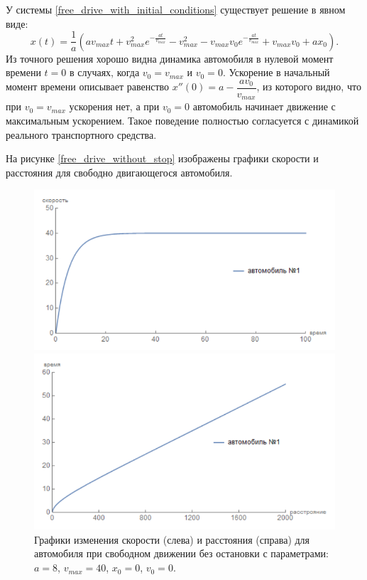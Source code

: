 \documentclass[12pt, a4paper]{extarticle}
\numberwithin{equation}{section}
\begin{document}
У системы \eqref{free_drive_with_initial_conditions} существует решение в явном виде:
\begin{equation*}
x(t) = \dfrac{1}{a}\left(av_{max}t+v_{max}^2e^{-\frac{at}{v_{max}}}-v_{max}^2-v_{max}v_0e^{-\frac{at}{v_{max}}}+v_{max}v_0+ax_0\right). 
\end{equation*}
Из точного решения хорошо видна динамика автомобиля в нулевой момент времени $t=0$ в случаях, когда $v_0=v_{max}$ и $v_0=0$. Ускорение в начальный момент времени описывает равенство $x''(0)=a-\dfrac{av_0}{v_{max}}$, из которого видно, что при $v_0=v_{max}$ ускорения нет, а при $v_0=0$ автомобиль начинает движение с максимальным ускорением. Такое поведение полностью согласуется с динамикой реального транспортного средства.

На рисунке \eqref{free_drive_without_stop} изображены графики скорости и расстояния для свободно двигающегося автомобиля.
\begin{figure}[h!]
	\begin{center}
		\begin{minipage}[h!]{0.48\linewidth}
			\includegraphics[width=1\linewidth,height=0.2\textheight]
			{Images/free_drive_speed.png}
		\end{minipage}
		\hfill 
		\begin{minipage}[h!]{0.48\linewidth}
			\includegraphics[width=1\linewidth,height=0.2\textheight]
			{Images/free_drive_distance.png}
		\end{minipage}
		\caption{Графики изменения скорости (слева) и расстояния (справа) для автомобиля при свободном движении без остановки с параметрами: $a=8$, $v_{max}=40$, $x_0=0$, $v_0=0$.}
		\label{free_drive_without_stop}
	\end{center}
\end{figure}
\end{document}
